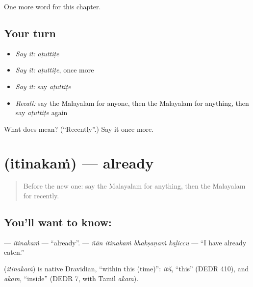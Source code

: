 \begin{grammarlens}[title={What you've built}]
One more word for this chapter.
\end{grammarlens}

\subsection*{Your turn}
\begin{itemize}
\raggedright
  \item \emph{Say it:} \emph{aṭuttiṭe}
  \item \emph{Say it:} \emph{aṭuttiṭe}, once more
  \item \emph{Say it:} say \emph{aṭuttiṭe}
  \item \emph{Recall:} say the Malayalam for anyone, then the Malayalam for anything, then say \emph{aṭuttiṭe} again
\end{itemize}

\begin{tcolorbox}[breakable,colback=teal!4,colframe=teal!35!black,title={Before you move on}]
What does  mean? (\textquotedblleft{}Recently\textquotedblright{}.) Say it once more.
\end{tcolorbox}
\section[\texorpdfstring{\ml{ഇതിനകം} (itinakaṁ)}{ഇതിനകം (itinakaṁ)}]{ (itinakaṁ) — already}

\label{lesson:ML-C178-itinakam}



\begin{quote}
Before the new one: say the Malayalam for anything, then the Malayalam for recently.
\end{quote}

\subsection*{You'll want to know: }
\textbf{} — \emph{itinakaṁ} — \textquotedblleft{}already\textquotedblright{}. \textbf{   } — \emph{ñān itinakaṁ bhakṣaṇaṁ kaḻiccu} — \textquotedblleft{}I have already eaten.\textquotedblright{}

\begin{cousinweb}
\textbf{} (\emph{itinakaṁ}) is native Dravidian, \textquotedblleft{}within this (time)\textquotedblright{}: \emph{itŭ}, \textquotedblleft{}this\textquotedblright{} (DEDR 410), and \emph{akam}, \textquotedblleft{}inside\textquotedblright{} (DEDR 7, with Tamil \emph{akam}).
\end{cousinweb}

